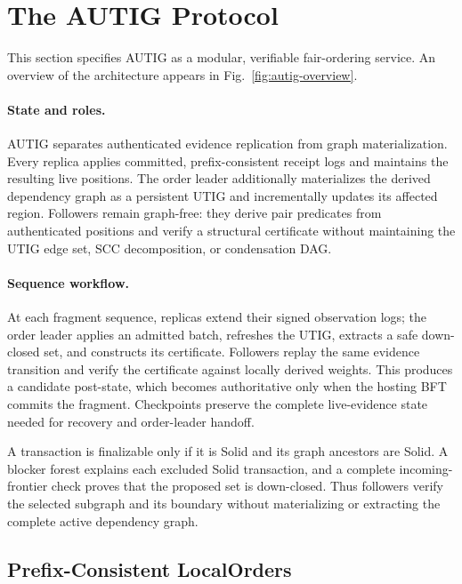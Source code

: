 \section{The AUTIG Protocol}
\label{sec:protocol}

This section specifies AUTIG as a modular, verifiable fair-ordering service. An overview of the architecture appears in Fig.~\ref{fig:autig-overview}.

\paragraph{State and roles.}
AUTIG separates authenticated evidence replication from graph materialization. Every replica applies committed, prefix-consistent receipt logs and maintains the resulting live positions.  The order leader additionally materializes the
derived dependency graph as a persistent UTIG and incrementally updates its affected region.  Followers remain graph-free: they derive pair predicates from authenticated positions and verify a structural certificate without maintaining the UTIG edge set, SCC decomposition, or condensation DAG.

\paragraph{Sequence workflow.}
At each fragment sequence, replicas extend their signed observation logs; the order leader applies an admitted batch, refreshes the UTIG, extracts a safe down-closed set, and constructs its certificate.
Followers replay the same evidence transition and verify the certificate against locally derived weights.  This produces a candidate post-state, which becomes authoritative only when the hosting BFT commits the fragment.
Checkpoints preserve the complete live-evidence state needed for recovery and order-leader handoff.

A transaction is finalizable only if it is Solid and its graph ancestors are Solid. A blocker forest explains each excluded Solid transaction, and a complete incoming-frontier check proves that the proposed set is down-closed.
Thus followers verify the selected subgraph and its boundary without materializing or extracting the complete active dependency graph.

\subsection{Prefix-Consistent LocalOrders}
\label{sec:prefix-consistent-localorders}

